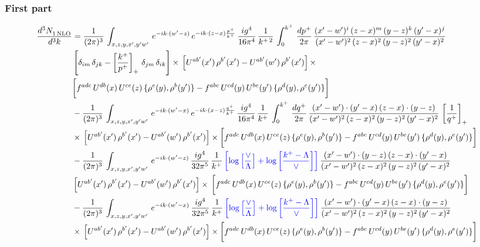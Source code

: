 \documentclass[9pt]{article}
\numberwithin{equation}{section}
\begin{document}
\subsubsection*{First part}
\begin{align}
     \frac{d^{3}N_{1\,\rm NLO}^{\rm}}{d^{3}k}  & = \frac{1}{(2\pi)^{3}}\, \int_{x,z,y,x',y'w'}\,e^{-ik\cdot (w^\prime-z)}\,e^{-ik\cdot (z-x)\frac{p^{+}}{k^{+}}}\,\frac{ig^{4}}{16\pi^{4}}\, \frac{1}{k^{+\,2}}\,\int_{0}^{k^{+}}\, \frac{dp^{+}}{2\pi}\,\frac{(x'-w')^{i}\,(z-x)^{m}\,(y-z)^{k}\,(y'-x)^{j}}{(x'-w')^{2}\,(z-x)^{2}\,(y-z)^{2}\,(y'-x)^{2}}\,\notag \\ & \left[\delta_{im}\,\delta_{jk}-\left[\frac{k^{+}}{p^{+}}\right]_{+}\, \delta_{jm}\,\delta_{ik}\right]\times\, \left[U^{ab'}(x')\,\rho^{b'}(x')-U^{ab'}(w')\,\rho^{b'}(x')\right]\times\notag \\ & \bigg[f^{adc}\,U^{db}(x)\,U^{ce}(z)\, \{\rho^{e}(y),\rho^{b}(y')\}-f^{abc}\,U^{cd}(y)\,U^{be}(y')\, \{\rho^{d}(y),\rho^{e}(y')\}\bigg]\notag \\ & -\frac{1}{(2\pi)^{3}}\, \int_{x,z,y,x',y'w'}\,e^{-ik\cdot (w^\prime-x)}\,e^{-ik\cdot (x-z)\frac{q^{+}}{k^{+}}}\,\frac{ig^{4}}{16\pi^{4}}\, \frac{1}{k^{+}}\,\int_{0}^{k^{+}}\, \frac{dq^{+}}{2\pi}\,\frac{(x'-w')\cdot (y'-x)\,(z-x)\cdot (y-z)}{(x'-w')^{2}\,(z-x)^{2}\,(y-z)^{2}\,(y'-x)^{2}}\,\left[\frac{1}{q^{+}}\right]_{+}\notag \\ & \times\, \left[U^{ab'}(x')\,\rho^{b'}(x')-U^{ab'}(w')\,\rho^{b'}(x')\right]\times \bigg[f^{adc}\,U^{db}(x)\,U^{ce}(z)\, \{\rho^{e}(y),\rho^{b}(y')\}-f^{abc}\,U^{cd}(y)\,U^{be}(y')\, \{\rho^{d}(y),\rho^{e}(y')\}\bigg]\notag \\ & -\frac{1}{(2\pi)^{3}}\, \int_{x,z,y,x',y'w'}\,e^{-ik\cdot (w^\prime-z)}\,\frac{ig^{4}}{32\pi^{5}}\, \frac{1}{k^{+}}\,{\color{blue}\left[\log{\left[\frac{\vee}{\Lambda}\right]} + \log{\left[\frac{k^{+}-\Lambda}{\vee}\right]}\right]}\,\frac{(x'-w')\cdot (y-z)\,(z-x)\cdot (y'-x)}{(x'-w')^{2}\,(z-x)^{2}\,(y-z)^{2}\,(y'-x)^{2}}\,\notag \\ & \left[U^{ab'}(x')\,\rho^{b'}(x')-U^{ab'}(w')\,\rho^{b'}(x')\right]\times\, \bigg[f^{adc}\,U^{db}(x)\,U^{ce}(z)\, \{\rho^{e}(y),\rho^{b}(y')\}-f^{abc}\,U^{cd}(y)\,U^{be}(y')\, \{\rho^{d}(y),\rho^{e}(y')\}\bigg]\notag \\ &  -\frac{1}{(2\pi)^{3}}\, \int_{x,z,y,x',y'w'}\,e^{-ik\cdot (w^\prime-x)}\,\frac{ig^{4}}{32\pi^{5}}\, \frac{1}{k^{+}}\,{\color{blue}\left[\log{\left[\frac{\vee}{\Lambda}\right]} + \log{\left[\frac{k^{+}-\Lambda}{\vee}\right]}\right]}\,\frac{(x'-w')\cdot (y'-x)\,(z-x)\cdot (y-z)}{(x'-w')^{2}\,(z-x)^{2}\,(y-z)^{2}\,(y'-x)^{2}}\notag \\ & \times\, \left[U^{ab'}(x')\,\rho^{b'}(x')-U^{ab'}(w')\,\rho^{b'}(x')\right]\times \bigg[f^{adc}\,U^{db}(x)\,U^{ce}(z)\, \{\rho^{e}(y),\rho^{b}(y')\}-f^{abc}\,U^{cd}(y)\,U^{be}(y')\, \{\rho^{d}(y),\rho^{e}(y')\}\bigg]
\end{align}
\end{document}
